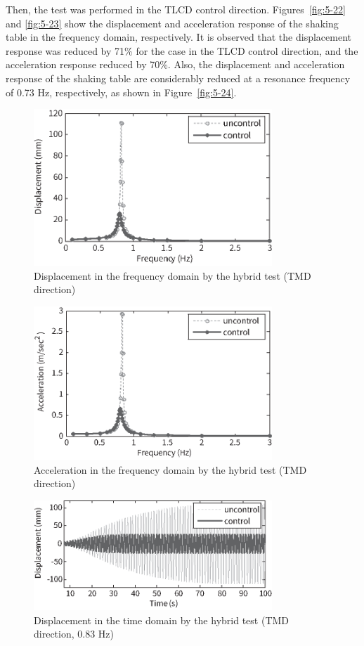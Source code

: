 Then, the test was performed in the TLCD control direction. Figures~\ref{fig:5-22} and \ref{fig:5-23} show the displacement and acceleration response of the shaking table in the frequency domain, respectively. It is observed that the displacement response was reduced by 71\% for the case in the TLCD control direction, and the acceleration response reduced by 70\%. Also, the displacement and acceleration response of the shaking table are considerably reduced at a resonance frequency of 0.73 Hz, respectively, as shown in Figure~\ref{fig:5-24}.

\begin{figure}[ht]
\centering
\includegraphics[width=0.8\textwidth] {figure/5-19.eps}
\caption{Displacement in the frequency domain by the hybrid test (TMD direction)}
\label{fig:5-19}
\end{figure}

\begin{figure}[ht]
\centering
\includegraphics[width=0.8\textwidth] {figure/5-20.eps}
\caption{Acceleration in the frequency domain by the hybrid test (TMD direction)}
\label{fig:5-20}
\end{figure}

\begin{figure}[ht]
\centering
\includegraphics[width=0.8\textwidth] {figure/5-21.eps}
\caption{Displacement in the time domain by the hybrid test (TMD direction, 0.83 Hz)}
\label{fig:5-21}
\end{figure}

